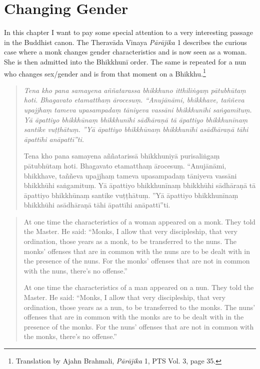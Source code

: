 \section{Changing Gender}
\label{trans}

In this chapter I want to pay some special attention to a very interesting passage in the Buddhist canon. The Theravāda Vinaya {\em Pā­rāji­ka} 1 describes the curious case where a monk changes gender characteristics and is now seen as a woman. She is then admitted into the Bhikkhunī order. The same is repeated for a nun who changes sex/gender and is from that moment on a Bhikkhu.\footnote{Translation by Ajahn Brahmali, {\em Pā­rāji­ka} 1, PTS Vol. 3, page 35.} 

\begin{quote}
{\em Tena kho pana samayena aññatarassa bhikkhuno itthiliṅgaṃ pātubhūtaṃ hoti. Bhagavato etamatthaṃ ārocesuṃ. “Anujānāmi, bhikkhave, taññeva upajjhaṃ tameva upasampadaṃ tāniyeva vassāni bhikkhunīhi saṅgamituṃ. Yā āpattiyo bhikkhūnaṃ bhikkhunīhi sādhāraṇā tā āpattiyo bhikkhunīnaṃ santike vuṭṭhātuṃ. ”Yā āpattiyo bhikkhūnaṃ bhikkhunīhi asādhāraṇā tāhi āpattīhi anāpattī”ti.

Tena kho pana samayena aññatarissā bhikkhuniyā purisaliṅgaṃ pātubhūtaṃ hoti. Bhagavato etamatthaṃ ārocesuṃ. “Anujānāmi, bhikkhave, taññeva upajjhaṃ tameva upasampadaṃ tāniyeva vassāni bhikkhūhi saṅgamituṃ. Yā āpattiyo bhikkhunīnaṃ bhikkhūhi sādhāraṇā tā āpattiyo bhikkhūnaṃ santike vuṭṭhātuṃ. ”Yā āpattiyo bhikkhunīnaṃ bhikkhūhi asādhāraṇā tāhi āpattīhi anāpattī”ti.}
\end{quote}

\begin{quote}
At one time the characteristics of a woman appeared on a monk. They told the Master. He said: “Monks, I allow that very discipleship, that very ordination, those years as a monk, to be transferred to the nuns. The monks’ offenses that are in common with the nuns are to be dealt with in the presence of the nuns. For the monks’ offenses that are not in common with the nuns, there’s no offense.”

At one time the characteristics of a man appeared on a nun. They told the Master. He said: “Monks, I allow that very discipleship, that very ordination, those years as a nun, to be transferred to the monks. The nuns’ offenses that are in common with the monks are to be dealt with in the presence of the monks. For the nuns’ offenses that are not in common with the monks, there’s no offense.”
\end{quote}

